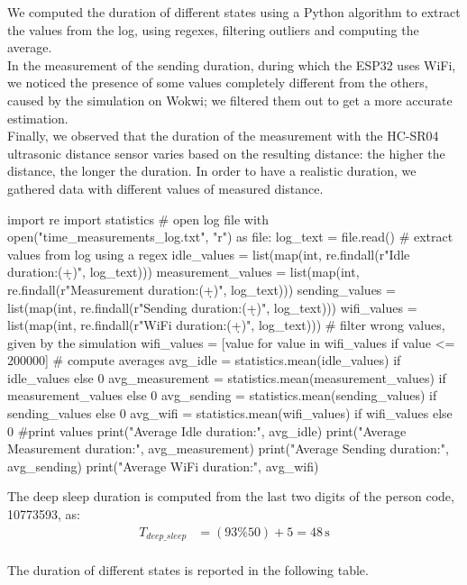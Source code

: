 We computed the duration of different states using a Python algorithm to extract the values from the log, using regexes, filtering outliers and computing the average. \\
In the measurement of the sending duration, during which the ESP32 uses WiFi, we noticed the presence of some values completely different from the others, caused by the simulation on Wokwi; we filtered them out to get a more accurate estimation. \\
Finally, we observed that the duration of the measurement with the HC-SR04 ultrasonic distance sensor varies based on the resulting distance: the higher the distance, the longer the duration. In order to have a realistic duration, we gathered data with different values of measured distance.

\begin{python}
import re
import statistics
# open log file
with open("time_measurements_log.txt", "r") as file:
    log_text = file.read()
# extract values from log using a regex 
idle_values = list(map(int, re.findall(r"Idle duration:\s*(\d+)", log_text)))
measurement_values = list(map(int, re.findall(r"Measurement duration:\s*(\d+)", log_text)))
sending_values = list(map(int, re.findall(r"Sending duration:\s*(\d+)", log_text)))
wifi_values = list(map(int, re.findall(r"WiFi duration:\s*(\d+)", log_text)))
# filter wrong values, given by the simulation
wifi_values = [value for value in wifi_values if value <= 200000]
# compute averages
avg_idle = statistics.mean(idle_values) if idle_values else 0
avg_measurement = statistics.mean(measurement_values) if measurement_values else 0
avg_sending = statistics.mean(sending_values) if sending_values else 0
avg_wifi = statistics.mean(wifi_values) if wifi_values else 0
#print values
print("Average Idle duration:", avg_idle)
print("Average Measurement duration:", avg_measurement)
print("Average Sending duration:", avg_sending)
print("Average WiFi duration:", avg_wifi)
\end{python}

The deep sleep duration is computed from the last two digits of the person code, 10773593, as:
\begin{align*}
	T_{deep\_sleep} &= (93 \% 50) + 5 = 48\,\text{s} \\ 
\end{align*}

The duration of different states is reported in the following table.

